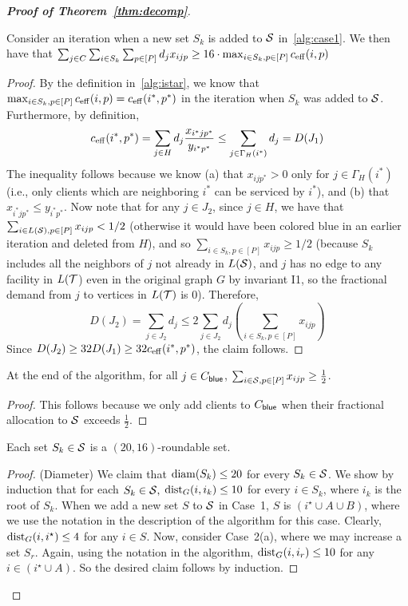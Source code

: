 \begin{proof}[{\bf Proof of Theorem~\ref{thm:decomp}}]
\begin{claim}\label{clm:imp}
Consider an iteration when a new set $S_k$ is added to ${\cal S}$ in~\cref{alg:case1}. We then have that $\sum_{j\in C} \sum_{i\in S_k}  \sum_{p\in [P]} d_j x_{ijp} \geq 16\cdot \max_{i\in S_k, p\in [P]} c_{\mathrm{eff}}(i,p) $
\end{claim}
\begin{proof}
By the definition in~\cref{alg:istar}, we know that $ \max_{i\in S_k, p\in [P]} c_{\mathrm{eff}}(i,p)  = c_{\mathrm{eff}}(i^*,p^*)$ in the iteration when $S_k$ was added to ${\cal S}$. Furthermore, by definition,
\[c_{\mathrm{eff}}(i^*,p^*) = \sum_{j\in H} d_j \frac{x_{i^*jp^*}}{y_{i^*p^*}} \leq \sum_{j\in \Gamma_H(i^*)} d_j = D(J_1)\]
The inequality follows because we know  (a) that $x_{ijp^*} > 0$ only for $j\in \Gamma_H(i^*)$ (i.e., only clients which are neighboring $i^*$ can be serviced by $i^*$), and (b) that $x_{i^*jp^*} \leq y_{i^*p^*}$.
Now note that for any $j\in J_2$, since $j\in H$, we have that $\sum_{i\in L({\cal S}), p\in [P]} x_{ijp} < 1/2$ (otherwise it would have been colored blue in an earlier iteration and deleted from $H$), and so $\sum_{i\in S_k, p\in [P]} x_{ijp} \geq 1/2$ (because $S_k$ includes all the neighbors of $j$ not already in $L({\cal S})$, and $j$ has no edge to any facility in $L({\cal T}$) even in the original graph $G$ by invariant I1, so the fractional demand from $j$ to vertices in $L({\cal T})$ is $0$).
Therefore,
\[
D(J_2) = \sum_{j\in J_2} d_j \leq 2 \sum_{j\in J_2} d_j \left(\sum_{i\in S_k, p\in [P]} x_{ijp}\right)
\]
Since $D(J_2) \geq 32D(J_1) \geq 32c_{\mathrm{eff}}(i^*,p^*)$, the claim follows.
\end{proof}


\begin{claim}
	At the end of the algorithm, for all $j \in C_{\mathsf{blue}}$, $\sum_{i \in {\cal S}, p \in [P]} x_{ijp} \geq \frac12$.	
\end{claim}
\begin{proof}
This follows because we only add clients to $C_{\mathsf{blue}}$ when their fractional allocation to ${\cal S}$ exceeds $\frac12$.
\end{proof}



\begin{lemma}
Each set $S_k \in {\cal S}$ is a $(20,16)$-roundable set.
\end{lemma}
\begin{proof}
(Diameter) We claim that $\mathrm{diam}(S_k) \leq 20$ for every $S_k \in {\cal S}$. We show by induction that for each $S_k \in {\cal S},$
$\mathrm{dist}_G(i,i_k) \leq 10$ for every $i \in S_k$, where $i_k$ is the root of $S_k$. When we add a new set $S$ to ${\cal S}$ in Case~1,
$S$ is $(i^\star \cup A \cup B)$, where we use the notation in the description of the algorithm for this case. Clearly, $\mathrm{dist}_G(i, i^\star) \leq 4$
for any $i \in S$. Now, consider Case~2(a), where we may increase a set $S_r$. Again, using the notation in the algorithm,
$\mathrm{dist}_G(i,i_r) \leq 10$ for any $i \in (i^\star \cup A)$. So the desired claim follows by induction.
\smallskip


\end{proof}
\end{proof}
